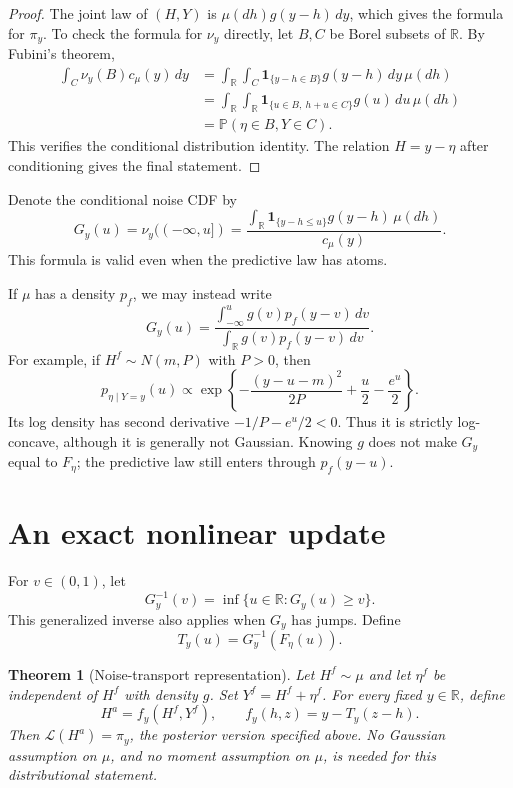 \documentclass[11pt]{article}
\newtheorem{theorem}[proposition]{Theorem}
\newcommand{\Pp}{\mathbb P}
\newcommand{\R}{\mathbb R}
\newcommand{\Law}{\mathcal L}
\newcommand{\ind}{\mathbf 1}
\begin{document}
\begin{proof}
The joint law of $(H,Y)$ is $\mu(dh)g(y-h)\,dy$, which gives the
formula for $\pi_y$. To check the formula for $\nu_y$ directly, let
$B,C$ be Borel subsets of $\R$. By Fubini's theorem,
\begin{align*}
\int_C \nu_y(B)c_\mu(y)\,dy
&=\int_\R\int_C
\ind_{\{y-h\in B\}}g(y-h)\,dy\,\mu(dh)\\
&=\int_\R\int_\R
\ind_{\{u\in B,\ h+u\in C\}}g(u)\,du\,\mu(dh)\\
&=\Pp(\eta\in B,Y\in C).
\end{align*}
This verifies the conditional distribution identity. The relation
$H=y-\eta$ after conditioning gives the final statement.
\end{proof}

Denote the conditional noise CDF by
\begin{equation}
G_y(u)=\nu_y((-\infty,u])
=\frac{\int_\R
\ind_{\{y-h\le u\}}g(y-h)\,\mu(dh)}{c_\mu(y)}.
\label{eq:conditional-cdf}
\end{equation}
This formula is valid even when the predictive law has atoms.

If $\mu$ has a density $p_f$, we may instead write
\[
G_y(u)=
\frac{\int_{-\infty}^u g(v)p_f(y-v)\,dv}
{\int_\R g(v)p_f(y-v)\,dv}.
\]
For example, if $H^f\sim N(m,P)$ with $P>0$, then
\[
p_{\eta\mid Y=y}(u)
\propto
\exp\left\{-\frac{(y-u-m)^2}{2P}
+\frac u2-\frac{e^u}{2}\right\}.
\]
Its log density has second derivative $-1/P-e^u/2<0$.
Thus it is strictly log-concave, although it is generally not Gaussian.
Knowing $g$ does not make $G_y$ equal to $F_\eta$; the predictive law
still enters through $p_f(y-u)$.

\section{An exact nonlinear update}

For $v\in(0,1)$, let
\[
G_y^{-1}(v)=\inf\{u\in\R:G_y(u)\ge v\}.
\]
This generalized inverse also applies when $G_y$ has jumps. Define
\begin{equation}
T_y(u)=G_y^{-1}(F_\eta(u)).
\label{eq:noise-map}
\end{equation}

\begin{theorem}[Noise-transport representation]
Let $H^f\sim\mu$ and let $\eta^f$ be independent of $H^f$ with density $g$.
Set $Y^f=H^f+\eta^f$. For every fixed $y\in\R$, define
\begin{equation}
H^a=f_y(H^f,Y^f),\qquad
f_y(h,z)=y-T_y(z-h).
\label{eq:update}
\end{equation}
Then $\Law(H^a)=\pi_y$, the posterior version specified above.
No Gaussian assumption on $\mu$, and no moment assumption on $\mu$,
is needed for this distributional statement.
\end{theorem}
\end{document}

